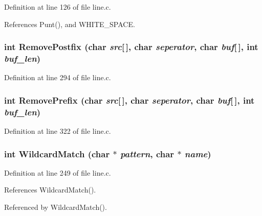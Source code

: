 Definition at line 126 of file line.c.

References Punt(), and WHITE\_\-SPACE.
\subsubsection{\setlength{\rightskip}{0pt plus 5cm}int Remove\-Postfix (char {\em src}[$\,$], char {\em seperator}, char {\em buf}[$\,$], int {\em buf\_\-len})}\label{line_8h_c1d305c49eb90cff85b02291d421257d}




Definition at line 294 of file line.c.
\subsubsection{\setlength{\rightskip}{0pt plus 5cm}int Remove\-Prefix (char {\em src}[$\,$], char {\em seperator}, char {\em buf}[$\,$], int {\em buf\_\-len})}\label{line_8h_685ca203aac471fb3367f8d524ceb00b}




Definition at line 322 of file line.c.
\subsubsection{\setlength{\rightskip}{0pt plus 5cm}int Wildcard\-Match (char $\ast$ {\em pattern}, char $\ast$ {\em name})}\label{line_8h_653809e6645e081a343e24067c0bdd09}




Definition at line 249 of file line.c.

References Wildcard\-Match().

Referenced by Wildcard\-Match().